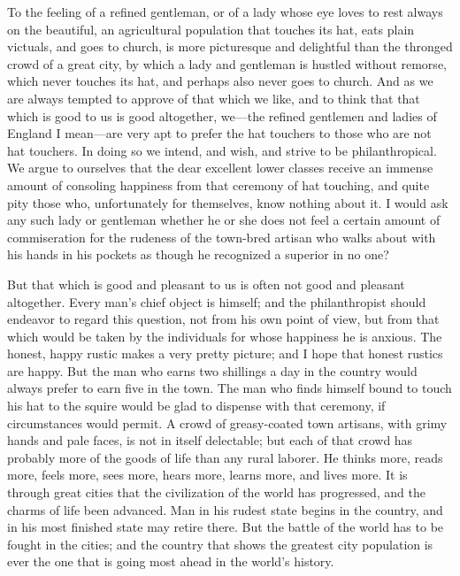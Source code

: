 To the feeling of a refined gentleman, or of a lady whose eye loves
to rest always on the beautiful, an agricultural population that
touches its hat, eats plain victuals, and goes to church, is more
picturesque and delightful than the thronged crowd of a great city,
by which a lady and gentleman is hustled without remorse, which
never touches its hat, and perhaps also never goes to church.  And
as we are always tempted to approve of that which we like, and to
think that that which is good to us is good altogether, we---the
refined gentlemen and ladies of England I mean---are very apt to
prefer the hat touchers to those who are not hat touchers.  In
doing so we intend, and wish, and strive to be philanthropical.  We
argue to ourselves that the dear excellent lower classes receive an
immense amount of consoling happiness from that ceremony of hat
touching, and quite pity those who, unfortunately for themselves,
know nothing about it.  I would ask any such lady or gentleman
whether he or she does not feel a certain amount of commiseration
for the rudeness of the town-bred artisan who walks about with his
hands in his pockets as though he recognized a superior in no one?

But that which is good and pleasant to us is often not good and
pleasant altogether.  Every man's chief object is himself; and the
philanthropist should endeavor to regard this question, not from
his own point of view, but from that which would be taken by the
individuals for whose happiness he is anxious.  The honest, happy
rustic makes a very pretty picture; and I hope that honest rustics
are happy.  But the man who earns two shillings a day in the
country would always prefer to earn five in the town.  The man who
finds himself bound to touch his hat to the squire would be glad to
dispense with that ceremony, if circumstances would permit.  A
crowd of greasy-coated town artisans, with grimy hands and pale
faces, is not in itself delectable; but each of that crowd has
probably more of the goods of life than any rural laborer.  He
thinks more, reads more, feels more, sees more, hears more, learns
more, and lives more.  It is through great cities that the
civilization of the world has progressed, and the charms of life
been advanced.  Man in his rudest state begins in the country, and
in his most finished state may retire there.  But the battle of the
world has to be fought in the cities; and the country that shows
the greatest city population is ever the one that is going most
ahead in the world's history.


